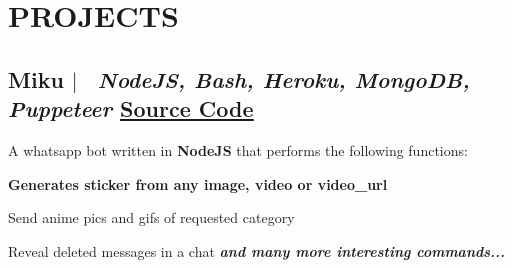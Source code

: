 \documentclass[11pt]{article}
\begin{document}

\section{PROJECTS}

\subsection*{
  Miku 
  $|$
  \normalsize \normalfont \ \textit{NodeJS, Bash, Heroku, MongoDB, Puppeteer}
  \hfill 
  \normalsize \underline{\href{https://github.com/HARSH-SHETH/miku}{Source Code}}
}
  A whatsapp bot written in \textbf{NodeJS} that performs the following functions: 
  \begin{description}
    \setlength{\itemsep}{0em}
    \setlength{\itemindent}{2\parindent}
    \item[$\bullet$]{ \textbf{Generates sticker from any image, video or video\_url }}
    \item[$\bullet$]{ Send anime pics and gifs of requested category}
    \item[$\bullet$]{ Reveal deleted messages in a chat}
    \emph{\textbf{and many more interesting commands...}}
  \end{description}

\end{document}
